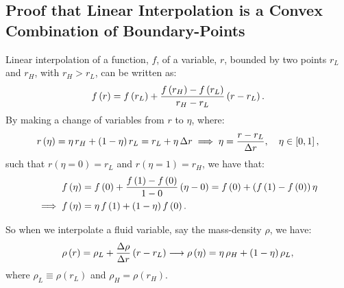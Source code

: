 \documentclass[10pt,preprint]{aastex}
\begin{document}
\subsection{Proof that Linear Interpolation is a Convex Combination of Boundary-Points}
Linear interpolation of a function, $f$, of a variable, $r$, bounded by two points $r_{L}$ and $r_{H}$, with $r_{H}>r_{L}$, can be written as:
\begin{equation}
    f\left(r\right)=f\left(r_{L}\right)+\frac{f\left(r_{H}\right)-f\left(r_{L}\right)}{r_{H}-r_{L}}\left(r-r_{L}\right).
\end{equation}
By making a change of variables from $r$ to $\eta$, where:
\begin{equation}
    r\left(\eta\right)=\eta\,r_{H}+\left(1-\eta\right)r_{L}=r_{L}+\eta\,\Delta r\implies\eta=\frac{r-r_{L}}{\Delta r},\hspace{1em}\eta\in\left[0,1\right],
\end{equation}
such that $r\left(\eta=0\right)=r_{L}$ and $r\left(\eta=1\right)=r_{H}$, we have that:
\begin{align}
    f\left(\eta\right)&=f\left(0\right)+\frac{f\left(1\right)-f\left(0\right)}{1-0}\left(\eta-0\right)=f\left(0\right)+\left(f\left(1\right)-f\left(0\right)\right)\eta\\
    \implies f\left(\eta\right)&=\eta\,f\left(1\right)+\left(1-\eta\right)f\left(0\right).
\end{align}

So when we interpolate a fluid variable, say the mass-density $\rho$, we have:
\begin{equation}
    \rho\left(r\right)=\rho_{L}+\frac{\Delta\rho}{\Delta r}\left(r-r_{L}\right)\longrightarrow\rho\left(\eta\right)=\eta\,\rho_{H}+\left(1-\eta\right)\rho_{L},
\end{equation}
where $\rho_{L}\equiv\rho\left(r_{L}\right)$ and $\rho_{H}=\rho\left(r_{H}\right)$.
\end{document}
